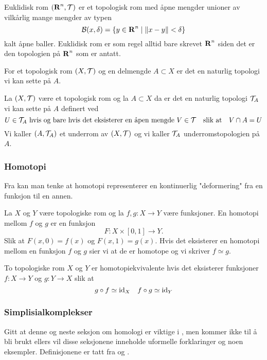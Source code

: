 \begin{eksempel}\label{Ex:EukTRom}
    Euklidisk rom $(\textnormal{\textbf{{R}}}^n,\mathcal{T})$ er et topologisk rom
    med åpne mengder unioner av vilkårlig mange mengder av
    typen
    \[\mathcal{B}(x,\delta) = \{y\in\textnormal{\textbf{{R}}}^n\;|\;
    \|x-y\|<\delta\}\]
    kalt åpne baller. Euklidisk rom er som regel alltid
    bare skrevet $\textnormal{\textbf{{R}}}^n$ siden det er den topologien på
    $\textnormal{\textbf{{R}}}^n$ som er antatt.
\end{eksempel}

For et topologisk rom $(X,\mathcal{T})$ og en delmengde
$A\subset X$ er det en naturlig topologi vi kan sette på
$A$.

\begin{definisjon}\label{Def:UnderTop}
    La $(X,\mathcal{T})$ være et topologisk rom og la $A\subset
    X$ da er det en naturlig topologi $\mathcal{T}_A$ vi kan
    sette på $A$ definert ved
    \[U\in\mathcal{T}_A \text{ hvis og bare hvis det eksisterer
    en åpen mengde } V\in\mathcal{T}\quad\text{slik at}\quad
    V\cap A = U\]
    Vi kaller $(A,\mathcal{T}_A)$ et underrom av $(X,\mathcal{T})$ og
    vi kaller $\mathcal{T}_A$ underromstopologien på $A$.
\end{definisjon}

\subsubsection{Homotopi}\label{sec:Homotopi}
Fra \citep[seksjon 51]{Munkres2013} kan man tenke at
homotopi representerer en kontinuerlig "deformering" fra en
funksjon til en annen.

\begin{definisjon}\label{Def:Homotopi}
    La $X$ og $Y$ være topologiske rom og la $f,g: X\to Y$
    være funksjoner. En homotopi mellom $f$ og $g$ er en
    funksjon
    \[F: X\times[0,1]\to Y.\]
    Slik at $F(x,0)=f(x)$ og $F(x,1)=g(x)$.
    Hvis det eksisterer en homotopi mellom en funksjon $f$
    og $g$ sier vi at de er homotope og vi skriver
    $f\simeq g$.
\end{definisjon} 

\begin{definisjon}\label{Def:HomotopiEkv}
    To topologiske rom $X$ og $Y$ er homotopiekvivalente
    hvis det eksisterer funksjoner $f: X\to Y$ og $g: Y\to
    X$ slik at
    \[g\circ f\simeq\textnormal{id}_X\quad f\circ g \simeq \textnormal{id}_Y\]
\end{definisjon}

\subsubsection{Simplisialkomplekser}\label{sek:SimpKomp}
Gitt at denne og neste seksjon om homologi er viktige
i , men kommer ikke til å bli
brukt ellers vil disse seksjonene inneholde uformelle
forklaringer og noen eksempler. Definisjonene er tatt fra
\citep[seksjon 1]{MunkresJamesR.2018EOAT} og
\citep[seksjon 2]{Munkr(esJamesR.2018EOAT}.

